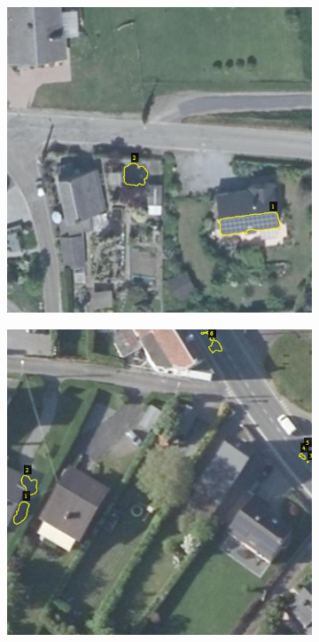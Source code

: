\documentclass[12pt]{beamer}
\begin{document}
\begin{frame}
    \begin{figure}
        \centering
        \vspace{1em}
    	\begin{subfigure}{0.48\textwidth}
    		\centering
    		\includegraphics[width=\textwidth]{resources/jpg/609591_532657.jpg}
    	\end{subfigure}
    	\hspace{0em}
    	\begin{subfigure}{0.48\textwidth}
    		\centering
    		\includegraphics[width=\textwidth]{resources/jpg/609601_533193.jpg}
    	\end{subfigure}
    \end{figure}
\end{frame}
\end{document}
